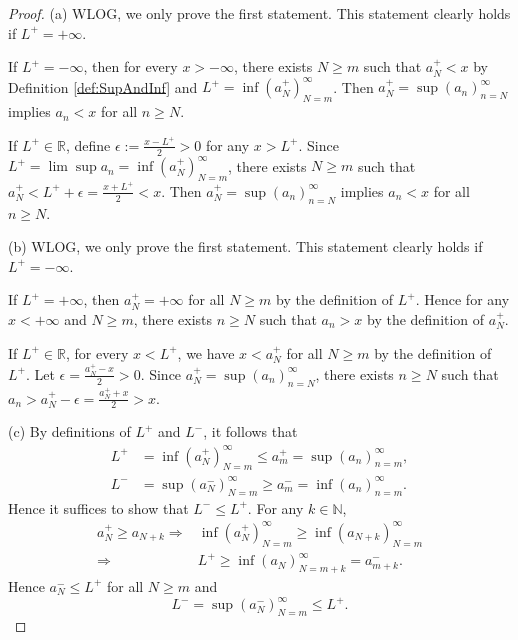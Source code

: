 \begin{proof}
  (a) WLOG, we only prove the first statement.
  This statement clearly holds if $L^{+}=+\infty$.
  
  If $L^{+}=-\infty$, then for every $x>-\infty$, 
  there exists $N\ge m$ such that  $a_{N}^{+}<x$
  by Definition \ref{def:SupAndInf}
  and $L^{+}=\inf(a_{N}^{+})_{N=m}^{\infty}$.
  Then $a_{N}^{+}=\sup(a_{n})_{n=N}^{\infty}$ implies
  $a_{n}<x$ for all $n\ge N$. 
  
  If $L^{+}\in \mathbb{R}$,
  define $\epsilon:=\frac{x-L^{+}}{2}>0$ for any $x>L^{+}$. 
  Since $L^{+}=\lim \sup a_{n}=\inf(a_{N}^{+})_{N=m}^{\infty}$,
  there exists $N\ge m$ such that
  $a_{N}^{+}<L^{+}+\epsilon=\frac{x+L^{+}}{2}<x$.
  Then $a_{N}^{+}=\sup(a_{n})_{n=N}^{\infty}$ implies
  $a_{n}<x$ for all $n\ge N$.

  (b) WLOG, we only prove the first statement.
  This statement clearly holds if $L^{+}=-\infty$.
  
  If $L^{+}=+\infty$, then $a_{N}^{+}=+\infty$ for all $N\ge m$
  by the definition of $L^{+}$.
  Hence for any $x<+\infty$ and $N\ge m$,
  there exists $n\ge N$ such that
  $a_{n}>x$ by the definition of $a_{N}^{+}$.
  
  If $L^{+}\in \mathbb{R}$,
  for every $x<L^{+}$, we have $x<a_{N}^{+}$ for all $N\ge m$
  by the definition of $L^{+}$.
  Let $\epsilon=\frac{a_{N}^{+}-x}{2}>0$.
  Since $a_{N}^{+}=\sup(a_{n})_{n=N}^{\infty}$,
  there exists $n\ge N$ such that
  $a_{n}>a_{N}^{+}-\epsilon=\frac{a_{N}^{+}+x}{2}>x$.

  (c) By definitions of $L^{+}$ and $L^{-}$, it follows that
  \begin{align*}
    L^{+}&=\inf(a_{N}^{+})_{N=m}^{\infty}\le a_{m}^{+}
           =\sup(a_{n})_{n=m}^{\infty},\\
    L^{-}&=\sup(a_{N}^{-})_{N=m}^{\infty}\ge a_{m}^{-}
           =\inf(a_{n})_{n=m}^{\infty}.
  \end{align*}
  Hence it suffices to show that $L^{-}\le L^{+}$.
  For any $k\in\mathbb{N}$, 
  \begin{align*}
     a_{N}^{+}\ge a_{N+k}
    \Rightarrow
    & \inf(a_{N}^{+})_{N=m}^{\infty}
      \ge \inf(a_{N+k})_{N=m}^{\infty}
    \\ \Rightarrow
    & L^{+} \ge \inf(a_{N})_{N=m+k}^{\infty} = a_{m+k}^{-}.
  \end{align*}
  Hence $a_{N}^{-} \le L^{+}$ for all $N\ge m$ and
  \begin{displaymath}
    L^{-}=\sup(a_{N}^{-})_{N=m}^{\infty}\le L^{+}.
  \end{displaymath}


\end{proof}
